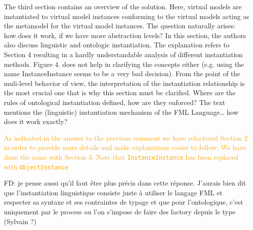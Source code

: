 \documentclass[10pt]{article}
\begin{document}
\begin{response}{The third section contains an overview of the solution. Here, virtual models are instantiated to virtual model instances conforming to the virtual models acting as the metamodel for the virtual model instances. The question naturally arises: how does it work, if we have more abstraction levels?  In this section, the authors also discuss linguistic and ontologic instantiation. The explanation refers to Section 4 resulting in a hardly understandable analysis of different instantiation methods. Figure 4. does not help in clarifying the concepts either (e.g. using the name InstanceInstance seems to be a very bad decision). From the point of the muli-level behavior of view, the interpretation of the instantiation relationship is the most crucial one that is why this section must be clarified. Where are the rules of ontological instantiation defined, how are they enforced? The text mentions the (linguistic) instantiation mechanism of the FML Language… how does it work exactly?}

\textcolor{orange}{As indicated in the answer to the previous comment we have refactored Section 2 in order to provide more details and make explanations easier to follow. We have done the same with Section 3. Note that \texttt{InstanceInstance} has been replaced with \texttt{ObjectInstance}} 

{\color{red} FD: je pense aussi qu'il faut être plus précis dans cette réponse. J'aurais bien dit que l'instantiation linguistique consiste juste à utiliser le langage FML et respecter sa syntaxe et ses contraintes de typage et que pour l'ontologique, c'est uniquement par le process ou l'on s'impose de faire des factory depuis le type (Sylvain ?)}

\end{response}
\end{document}
